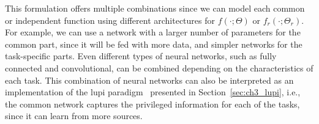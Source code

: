 This formulation offers multiple combinations since we can model each common or independent function using different architectures for $f(\cdot; \Theta)$ or $f_r(\cdot; \Theta_r)$.
%
For example, we can use a network with a larger number of parameters for the common part, since it will be fed with more data, and simpler networks for the task-specific parts.
%
Even different types of neural networks, such as fully connected and convolutional, can be combined depending on the characteristics of each task.
This combination of neural networks can also be interpreted as an implementation of the \acrfull{lupi} paradigm~\citep{VapnikI15a} presented in Section~\ref{sec:ch3_lupi}, i.e., the common network captures the privileged information for each of the tasks, since it can learn from more sources.
%


